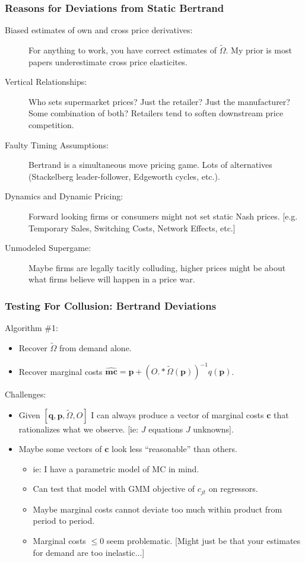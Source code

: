 \documentclass[xcolor=pdftex,dvipsnames,table,mathserif]{beamer}
\begin{document}
\begin{frame}
\frametitle{Reasons for Deviations from Static Bertrand}
\small
\begin{description}
\item[Biased estimates of own and cross price derivatives:] For anything to work, you have correct estimates of $\tilde{\Omega}$. My prior is most papers \alert{underestimate} cross price elasticites.
\item[Vertical Relationships:] Who sets supermarket prices? Just the retailer? Just the manufacturer? Some combination of both? Retailers tend to \alert{soften} downstream price competition.
\item[Faulty Timing Assumptions:] Bertrand is a simultaneous move pricing game. Lots of alternatives (Stackelberg leader-follower, Edgeworth cycles, etc.).
\item[Dynamics and Dynamic Pricing:] Forward looking firms or consumers might not set static Nash prices. [e.g. Temporary Sales, Switching Costs, Network Effects, etc.]
\item[Unmodeled Supergame:] Maybe firms are legally tacitly colluding, higher prices might be about what firms believe will happen in a price war.
\end{description}
\end{frame}
\begin{frame}

\frametitle{Testing For Collusion: Bertrand Deviations}
Algorithm \#1:
\begin{itemize}
\item Recover $\tilde{\Omega}$ from demand alone.
\item Recover marginal costs $\widehat{\mathbf{mc}} = \mathbf{p} +(O.*\tilde{\Omega}(\mathbf{p}))^{-1} q(\mathbf{p})$.
\end{itemize}
Challenges:
\begin{itemize}
\item Given $[\mathbf{q},\mathbf{p},\tilde{\Omega},O]$ I can always produce a vector of marginal costs $\mathbf{c}$ that rationalizes what we observe. [ie: $J$ equations $J$ unknowns].
\item Maybe some vectors of $\mathbf{c}$ look less ``reasonable'' than others.
\begin{itemize}
\item ie: I have a parametric model of MC in mind. 
\item Can test that model with GMM objective of $c_{jt}$ on regressors.
\item Maybe marginal costs cannot deviate too much within product from period to period.
\item Marginal costs $\leq 0$ seem problematic. [Might just be that your estimates for demand are too inelastic...]
\end{itemize}
\end{itemize}
\end{frame}
\end{document}
